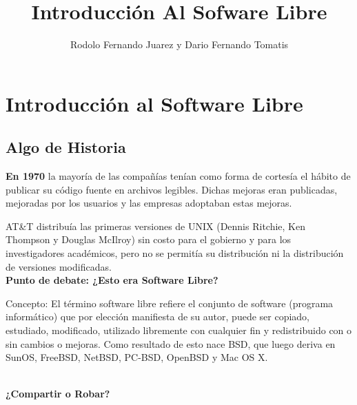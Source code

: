 \documentclass{book}
\title{Introducción Al Sofware Libre}
\author{Rodolo Fernando Juarez y Dario Fernando Tomatis}
\begin{document}
\maketitle
\section{Introducción al Software Libre}
\subsection{Algo de Historia}

{\bf En 1970} la mayoría de las compañías tenían como forma de cortesía el hábito de publicar su código fuente en archivos legibles. Dichas mejoras eran publicadas, mejoradas por los usuarios y las empresas adoptaban estas mejoras.

AT\&T distribuía las primeras versiones de UNIX (Dennis Ritchie, Ken Thompson y Douglas McIlroy) sin costo para el gobierno y para los investigadores académicos, pero no se permitía su distribución ni la distribución de versiones modificadas. 
\\
{\bf Punto de debate: ¿Esto era Software Libre?}
{\it 

Concepto:
El término software libre refiere el conjunto de software (programa informático) que por elección manifiesta de su autor, puede ser copiado, estudiado, modificado, utilizado libremente con cualquier fin y redistribuido con o sin cambios o mejoras.
Como resultado de esto nace BSD, que luego deriva en SunOS, FreeBSD, NetBSD, PC-BSD, OpenBSD y Mac OS X.
}
\\
{\bf ¿Compartir o Robar?}
\end{document}
